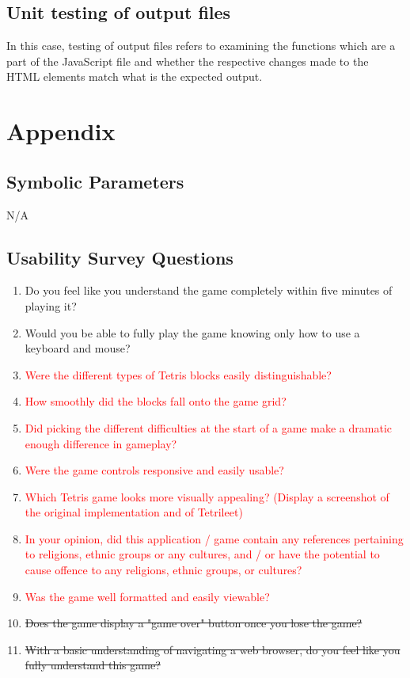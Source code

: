 \documentclass[12pt, titlepage]{article}
\begin{document}
\subsection{Unit testing of output files}
        In this case, testing of output files refers to examining the functions which are a part of the JavaScript file and whether the respective changes made to the HTML elements match what is the expected output.





\newpage

\section{Appendix}

\subsection{Symbolic Parameters}

N/A

\subsection{Usability Survey Questions}

\begin{enumerate}
    \item Do you feel like you understand the game completely within five minutes of playing it?
    \item Would you be able to fully play the game knowing only how to use a keyboard and mouse?
    \item \textcolor{red}{Were the different types of Tetris blocks easily distinguishable?}
    \item \textcolor{red}{How smoothly did the blocks fall onto the game grid?}
    \item \textcolor{red}{Did picking the different difficulties at the start of a game make a dramatic enough difference in gameplay?}
    \item \textcolor{red}{Were the game controls responsive and easily usable?}
    \item \textcolor{red}{Which Tetris game looks more visually appealing? (Display a screenshot of the original implementation and of Tetrileet)}
    \item \textcolor{red}{In your opinion, did this application / game contain any references pertaining to religions, ethnic groups or any cultures, and / or have the potential to cause offence to any religions, ethnic groups, or cultures?}
    \item \textcolor{red}{Was the game well formatted and easily viewable?}
    \item \sout{Does the game display a "game over" button once you lose the game?}
    \item \sout{With a basic understanding of navigating a web browser, do you feel like you fully understand this game?}
\end{enumerate}
\end{document}
